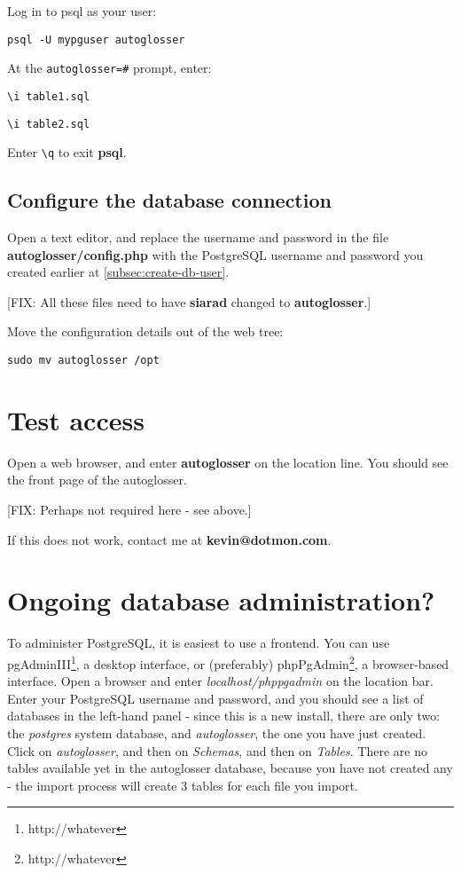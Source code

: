 \documentclass[a4paper,10pt]{article}
\begin{document}
{Log in to psql as your user:

\texttt{psql -U mypguser autoglosser}

At the \verb|autoglosser=#| prompt, enter:

\verb|\i table1.sql|

\verb|\i table2.sql|

Enter \verb|\q| to exit \textbf{psql}.

\subsection{Configure the database connection}

Open a text editor, and replace the username and password in the file \textbf{autoglosser/config.php} with the PostgreSQL username and password you created earlier at \ref{subsec:create-db-user}.

[FIX: All these files need to have \textbf{siarad} changed to \textbf{autoglosser}.]

Move the configuration details out of the web tree:

\texttt{sudo mv autoglosser /opt}

\section{Test access}

Open a web browser, and enter \textbf{autoglosser} on the location line.  You should see the front page of the autoglosser.

[FIX: Perhaps not required here - see above.]

If this does not work, contact me at \textbf{kevin@dotmon.com}.

\section{Ongoing database administration?}

To administer PostgreSQL, it is easiest to use a frontend.  You can use pgAdminIII\footnote{http://whatever}, a desktop interface, or (preferably) phpPgAdmin\footnote{http://whatever}, a browser-based interface.  Open a browser and enter \textit{localhost/phppgadmin} on the location bar.  Enter your PostgreSQL username and password, and you should see a list of databases in the left-hand panel - since this is a new install, there are only two: the \textit{postgres} system database, and \textit{autoglosser}, the one you have just created.  Click on \textit{autoglosser}, and then on \textit{Schemas}, and then on \textit{Tables}.  There are no tables available yet in the autoglosser database, because you have not created any - the import process will create 3 tables for each file you import. 

}
\end{document}
